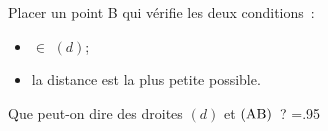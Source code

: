 \documentclass[activite]{thedocument}
\begin{document}
    Placer un point B qui vérifie les deux conditions~:
    \begin{itemize}
        \item {} $\in$ $(d)$;
        \item la distance  est la plus petite possible.
    \end{itemize}
    \vskip30pt{\centering
    }\par
     Que peut-on dire des droites $(d)$ et $(\text{AB})$~?
    \begingroup\linewidth=.95\linewidth\noindent
    \dotedline\dotedline\dotedline\endgroup
\end{document}
